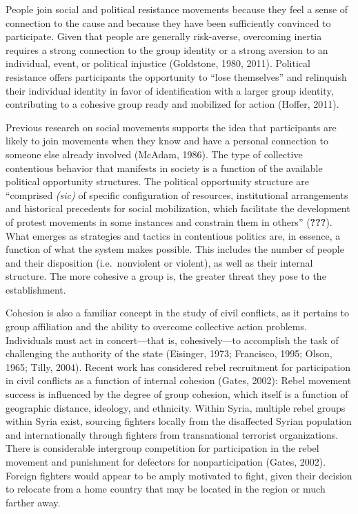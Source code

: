 \documentclass[
  english,
  man]{apa6}
\begin{document}
People join social and political resistance movements because they feel a sense
of connection to the cause and because they have been sufficiently convinced to
participate. Given that people are generally risk-averse, overcoming inertia
requires a strong connection to the group identity or a strong aversion to an individual,
event, or political injustice (Goldstone, 1980, 2011).
Political resistance offers participants the opportunity to \enquote{lose themselves} and
relinquish their individual identity in favor of identification with a larger
group identity, contributing to a cohesive group ready and mobilized for
action (Hoffer, 2011).

Previous research on social movements supports the idea that participants are
likely to join movements when they know and have a personal connection to
someone else already involved (McAdam, 1986). The type of collective
contentious behavior that manifests in society is a function of the available
political opportunity structures. The political opportunity structure are
\enquote{comprised \emph{(sic)} of specific configuration of resources, institutional
arrangements and historical precedents for social mobilization, which facilitate
the development of protest movements in some instances and constrain them in
others} ({\textbf{???}}). What emerges as strategies and tactics in contentious
politics are, in essence, a function of what the system makes possible. This
includes the number of people and their disposition (i.e.~nonviolent or
violent), as well as their internal structure. The more cohesive a group is, the
greater threat they pose to the establishment.

Cohesion is also a familiar concept in the study of civil conflicts, as it
pertains to group affiliation and the ability to overcome collective action
problems. Individuals must act in concert---that is, cohesively---to
accomplish the task of challenging the authority of the state (Eisinger, 1973; Francisco, 1995; Olson, 1965; Tilly, 2004).
Recent work has considered rebel recruitment for participation in
civil conflicts as a function of internal cohesion (Gates, 2002):
Rebel movement success is influenced by the degree of group cohesion, which
itself is a function of geographic distance, ideology, and ethnicity.
Within Syria, multiple rebel groups within Syria exist, sourcing fighters locally
from the disaffected Syrian population and internationally through
fighters from transnational terrorist organizations. There is considerable
intergroup competition for participation in the rebel movement and
punishment for defectors for nonparticipation (Gates, 2002).
Foreign fighters would appear to be amply motivated to fight, given their
decision to relocate from a home country that may be located in the region
or much farther away.
\end{document}
